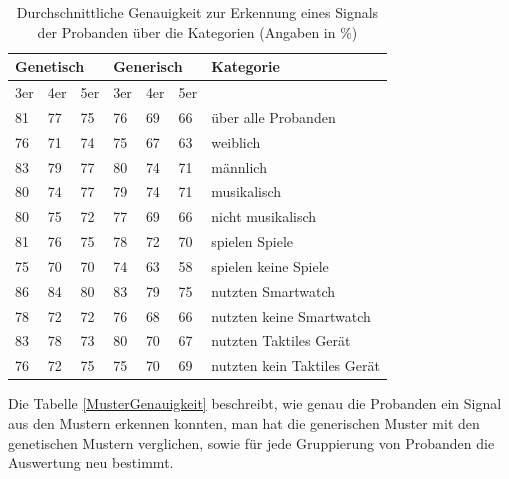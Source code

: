 \begin{table}[]
\centering
\caption{Durchschnittliche Genauigkeit zur Erkennung eines Signals der Probanden {\"u}ber die Kategorien (Angaben in \%)}
\label{MusterGenauigkeit}
\begin{tabular}{llllll|l}
\hline
\multicolumn{3}{l}{Genetisch} & \multicolumn{3}{l|}{Generisch} & Kategorie      \\ \hline
3er    & 4er    & 5er   & 3er    & 4er    & 5er   &                             \\ \hline
81     & 77     & 75    & 76     & 69     & 66    & {\"u}ber alle Probanden         \\ \hline
76     & 71     & 74    & 75     & 67     & 63    & weiblich                    \\
83     & 79     & 77    & 80     & 74     & 71    & m{\"a}nnlich                    \\ \hline
80     & 74     & 77    & 79     & 74     & 71    & musikalisch                 \\
80     & 75     & 72    & 77     & 69     & 66    & nicht musikalisch           \\ \hline
81     & 76     & 75    & 78     & 72     & 70    & spielen Spiele              \\
75     & 70     & 70    & 74     & 63     & 58    & spielen keine Spiele        \\ \hline
86     & 84     & 80    & 83     & 79     & 75    & nutzten Smartwatch          \\
78     & 72     & 72    & 76     & 68     & 66    & nutzten keine Smartwatch    \\ \hline
83     & 78     & 73    & 80     & 70     & 67    & nutzten Taktiles Ger{\"a}t      \\
76     & 72     & 75    & 75     & 70     & 69    & nutzten kein Taktiles Ger{\"a}t
\end{tabular}
\end{table}

Die Tabelle \autoref{MusterGenauigkeit} beschreibt, wie genau die Probanden ein Signal aus den Mustern erkennen konnten, man hat die generischen Muster mit den genetischen Mustern verglichen, sowie f{\"u}r jede Gruppierung von Probanden die Auswertung neu bestimmt. 

